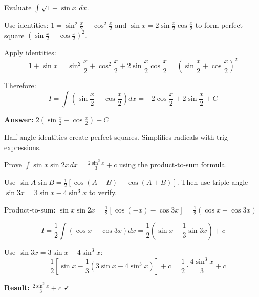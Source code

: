 \vspace{1cm}

\begin{problem}
Evaluate $\int \sqrt{1 + \sin x} \, dx$.
\end{problem}

\begin{hint}
Use identities: $1 = \sin^2\frac{x}{2} + \cos^2\frac{x}{2}$ and $\sin x = 2\sin\frac{x}{2}\cos\frac{x}{2}$ to form perfect square $(\sin\frac{x}{2} + \cos\frac{x}{2})^2$.
\end{hint}

\begin{solution}
Apply identities:
\[
1 + \sin x = \sin^2\frac{x}{2} + \cos^2\frac{x}{2} + 2\sin\frac{x}{2}\cos\frac{x}{2} = \left(\sin\frac{x}{2} + \cos\frac{x}{2}\right)^2
\]

Therefore:
\[
I = \int \left(\sin\frac{x}{2} + \cos\frac{x}{2}\right) dx = -2\cos\frac{x}{2} + 2\sin\frac{x}{2} + C
\]

\textbf{Answer:} $\boxed{2\left(\sin\frac{x}{2} - \cos\frac{x}{2}\right) + C}$
\end{solution}

\begin{takeaways}
Half-angle identities create perfect squares. Simplifies radicals with trig expressions.
\end{takeaways}

\vspace{1cm}

\begin{problem}
Prove $\int \sin x \sin 2x \, dx = \frac{2\sin^3 x}{3} + c$ using the product-to-sum formula.
\end{problem}

\begin{hint}
Use $\sin A \sin B = \frac{1}{2}[\cos(A-B) - \cos(A+B)]$. Then use triple angle $\sin 3x = 3\sin x - 4\sin^3 x$ to verify.
\end{hint}

\begin{solution}
Product-to-sum: $\sin x \sin 2x = \frac{1}{2}[\cos(-x) - \cos 3x] = \frac{1}{2}(\cos x - \cos 3x)$

\[
I = \frac{1}{2}\int(\cos x - \cos 3x)dx = \frac{1}{2}\left(\sin x - \frac{1}{3}\sin 3x\right) + c
\]

Use $\sin 3x = 3\sin x - 4\sin^3 x$:
\[
= \frac{1}{2}\left[\sin x - \frac{1}{3}(3\sin x - 4\sin^3 x)\right] + c = \frac{1}{2} \cdot \frac{4\sin^3 x}{3} + c
\]

\textbf{Result:} $\boxed{\frac{2\sin^3 x}{3} + c}$ ✓
\end{solution}

